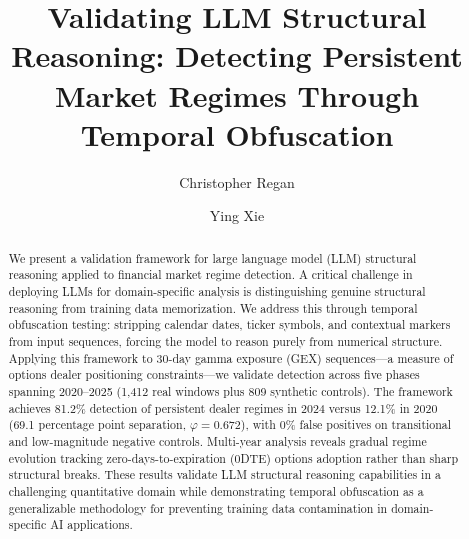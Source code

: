 \documentclass[runningheads,a4paper]{llncs}
\begin{document}
\title{Validating LLM Structural Reasoning: Detecting Persistent Market Regimes Through Temporal Obfuscation}


\author{Christopher Regan \and
Ying Xie}



\maketitle

\begin{abstract}
We present a validation framework for large language model (LLM) structural reasoning applied to financial market regime detection. A critical challenge in deploying LLMs for domain-specific analysis is distinguishing genuine structural reasoning from training data memorization. We address this through temporal obfuscation testing: stripping calendar dates, ticker symbols, and contextual markers from input sequences, forcing the model to reason purely from numerical structure. Applying this framework to 30-day gamma exposure (GEX) sequences---a measure of options dealer positioning constraints---we validate detection across five phases spanning 2020--2025 (1,412 real windows plus 809 synthetic controls). The framework achieves 81.2\% detection of persistent dealer regimes in 2024 versus 12.1\% in 2020 (69.1 percentage point separation, $\varphi = 0.672$), with 0\% false positives on transitional and low-magnitude negative controls. Multi-year analysis reveals gradual regime evolution tracking zero-days-to-expiration (0DTE) options adoption rather than sharp structural breaks. These results validate LLM structural reasoning capabilities in a challenging quantitative domain while demonstrating temporal obfuscation as a generalizable methodology for preventing training data contamination in domain-specific AI applications.

\end{abstract}
\end{document}
